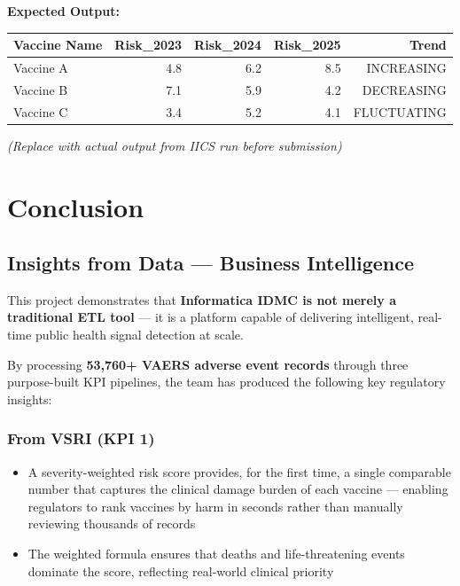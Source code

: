 \documentclass[12pt,a4paper]{report}
\begin{document}
\bigskip

\noindent\textbf{Expected Output:}

\begin{center}
\begin{tabular}{lrrrr}
\toprule
\textbf{Vaccine Name} & \textbf{Risk\_2023} & \textbf{Risk\_2024} & \textbf{Risk\_2025} & \textbf{Trend} \\
\midrule
Vaccine A & 4.8 & 6.2 & 8.5 & INCREASING   \\
Vaccine B & 7.1 & 5.9 & 4.2 & DECREASING   \\
Vaccine C & 3.4 & 5.2 & 4.1 & FLUCTUATING  \\
\bottomrule
\end{tabular}
\end{center}

\vspace{6pt}
\noindent\textit{(Replace with actual output from IICS run before submission)}

\chapter{Conclusion}

\section{Insights from Data — Business Intelligence}

This project demonstrates that \textbf{Informatica IDMC is not merely a traditional ETL tool} — it is a platform capable of delivering intelligent, real-time public health signal detection at scale.

\medskip

By processing \textbf{53,760+ VAERS adverse event records} through three purpose-built KPI pipelines, the team has produced the following key regulatory insights:

\subsection*{From VSRI (KPI 1)}
\begin{itemize}[leftmargin=*]
  \item A severity-weighted risk score provides, for the first time, a single comparable number that captures the clinical damage burden of each vaccine — enabling regulators to rank vaccines by harm in seconds rather than manually reviewing thousands of records
  \item The weighted formula ensures that deaths and life-threatening events dominate the score, reflecting real-world clinical priority
\end{itemize}
\end{document}
